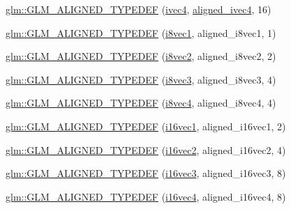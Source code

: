 \begin{DoxyCompactItemize}
\item 
\hyperlink{group__gtx__type__aligned_ga50d8a9523968c77f8325b4c9bfbff41e}{glm\+::\+G\+L\+M\+\_\+\+A\+L\+I\+G\+N\+E\+D\+\_\+\+T\+Y\+P\+E\+D\+EF} (\hyperlink{group__core__types_gaa4560ddc50320ea8f8a70d5c9c249fea}{ivec4}, \hyperlink{group__gtc__type__aligned_gaa33169a30c7d22a8648f20b4534f635f}{aligned\+\_\+ivec4}, 16)
\item 
\hyperlink{group__gtx__type__aligned_ga9ec20fdfb729c702032da9378c79679f}{glm\+::\+G\+L\+M\+\_\+\+A\+L\+I\+G\+N\+E\+D\+\_\+\+T\+Y\+P\+E\+D\+EF} (\hyperlink{group__gtc__type__precision_ga1e3db56de9a181840090416b6a5bd5f7}{i8vec1}, aligned\+\_\+i8vec1, 1)
\item 
\hyperlink{group__gtx__type__aligned_ga25b3fe1d9e8d0a5e86c1949c1acd8131}{glm\+::\+G\+L\+M\+\_\+\+A\+L\+I\+G\+N\+E\+D\+\_\+\+T\+Y\+P\+E\+D\+EF} (\hyperlink{group__gtc__type__precision_gade57e4b55fe2b2345a4f2ac2b149cd32}{i8vec2}, aligned\+\_\+i8vec2, 2)
\item 
\hyperlink{group__gtx__type__aligned_ga2958f907719d94d8109b562540c910e2}{glm\+::\+G\+L\+M\+\_\+\+A\+L\+I\+G\+N\+E\+D\+\_\+\+T\+Y\+P\+E\+D\+EF} (\hyperlink{group__gtc__type__precision_ga9babb834daa1f84c23821bd21669c2e8}{i8vec3}, aligned\+\_\+i8vec3, 4)
\item 
\hyperlink{group__gtx__type__aligned_ga1fe6fc032a978f1c845fac9aa0668714}{glm\+::\+G\+L\+M\+\_\+\+A\+L\+I\+G\+N\+E\+D\+\_\+\+T\+Y\+P\+E\+D\+EF} (\hyperlink{group__gtc__type__precision_gaaad99cfb998ddcb74e9c33d0149fdd0e}{i8vec4}, aligned\+\_\+i8vec4, 4)
\item 
\hyperlink{group__gtx__type__aligned_gaa4161e7a496dc96972254143fe873e55}{glm\+::\+G\+L\+M\+\_\+\+A\+L\+I\+G\+N\+E\+D\+\_\+\+T\+Y\+P\+E\+D\+EF} (\hyperlink{group__gtc__type__precision_ga51ac9cc5aa60aa41bf37ccbf900db94f}{i16vec1}, aligned\+\_\+i16vec1, 2)
\item 
\hyperlink{group__gtx__type__aligned_ga9d7cb211ccda69b1c22ddeeb0f3e7aba}{glm\+::\+G\+L\+M\+\_\+\+A\+L\+I\+G\+N\+E\+D\+\_\+\+T\+Y\+P\+E\+D\+EF} (\hyperlink{group__gtc__type__precision_gad912fd04abb876a5b806118ec6e0f283}{i16vec2}, aligned\+\_\+i16vec2, 4)
\item 
\hyperlink{group__gtx__type__aligned_gaaee91dd2ab34423bcc11072ef6bd0f02}{glm\+::\+G\+L\+M\+\_\+\+A\+L\+I\+G\+N\+E\+D\+\_\+\+T\+Y\+P\+E\+D\+EF} (\hyperlink{group__gtc__type__precision_ga1f2b1dd6e4d9109be5f4433c8ff38cb8}{i16vec3}, aligned\+\_\+i16vec3, 8)
\item 
\hyperlink{group__gtx__type__aligned_ga49f047ccaa8b31fad9f26c67bf9b3510}{glm\+::\+G\+L\+M\+\_\+\+A\+L\+I\+G\+N\+E\+D\+\_\+\+T\+Y\+P\+E\+D\+EF} (\hyperlink{group__gtc__type__precision_ga99a249a4cc129cb527c48d3afd38b666}{i16vec4}, aligned\+\_\+i16vec4, 8)

\end{DoxyCompactItemize}
